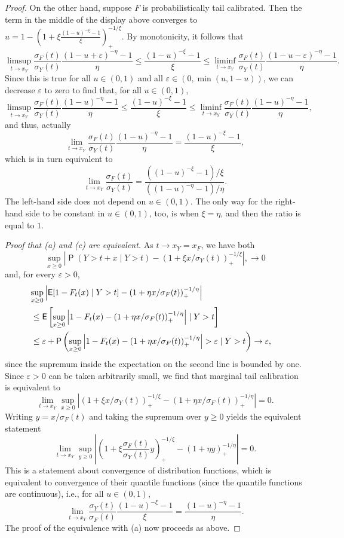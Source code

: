 \documentclass[12pt]{article}
\newcommand{\E}{\operatorname{\mathsf{E}}}
\newcommand{\Q}{\operatorname{\mathsf{P}}}
\newcommand{\1}{\mathbf{1}} %
\newcommand{\eps}{\varepsilon}
\theoremstyle{definition}
\begin{document}
\begin{proof}
On the other hand, suppose $F$ is probabilistically tail calibrated. Then the term in the middle of the display above converges to $u = 1 - (1+\xi \frac{(1-u)^{-\xi}-1}{\xi})_+^{-1/\xi}$. By monotonicity, it follows that
\[
	\limsup_{t \to x_Y}
	\frac{\sigma_F(t)}{\sigma_Y(t)} \frac{(1-u+\eps)^{-\eta}-1}{\eta}
	\le 
	\frac{(1-u)^{-\xi}-1}{\xi}
	\le
	\liminf_{t \to x_Y}
	\frac{\sigma_F(t)}{\sigma_Y(t)} \frac{(1-u-\eps)^{-\eta}-1}{\eta}.
\]
Since this is true for all $u \in (0, 1)$ and all $\eps \in (0, \min(u,1-u))$, we can decrease $\eps$ to zero to find that, for all $u \in (0,1)$,
\[
	\limsup_{t \to x_Y}
	\frac{\sigma_F(t)}{\sigma_Y(t)} \frac{(1-u)^{-\eta}-1}{\eta}
	\le 
	\frac{(1-u)^{-\xi}-1}{\xi}
	\le
	\liminf_{t \to x_Y}
	\frac{\sigma_F(t)}{\sigma_Y(t)} \frac{(1-u)^{-\eta}-1}{\eta},
\]
and thus, actually
\[
	\lim_{t \to x_Y}
	\frac{\sigma_F(t)}{\sigma_Y(t)} \frac{(1-u)^{-\eta}-1}{\eta}
	=
	\frac{(1-u)^{-\xi}-1}{\xi},
\]
which is in turn equivalent to
\[
	\lim_{t \to x_Y}
	\frac{\sigma_F(t)}{\sigma_Y(t)} 
	=
	\frac{\left((1-u)^{-\xi}-1\right)/\xi}{\left((1-u)^{-\eta}-1\right)/\eta}.
\]
The left-hand side does not depend on $u \in (0, 1)$.
The only way for the right-hand side to be constant in $u \in (0, 1)$, too, is when $\xi = \eta$, and then the ratio is equal to $1$.

\noindent\emph{Proof that (a) and (c) are equivalent.}
As $t \to x_Y = x_F$, we have both
\[
	\sup_{x \ge 0} \left| \Q(Y > t + x \mid Y > t) - \left(1+\xi x/\sigma_Y(t)\right)_+^{-1/\xi} \right|,
	\to 0
\]
and, for every $\eps > 0$,
\begin{align*}
	\lefteqn{
		\sup_{x \ge 0} \left| \E[1-F_t(x) \mid Y>t] - \left(1+\eta x/\sigma_F(t)\right)_+^{-1/\eta} \right| 
	} \\
	&\le
	\E\left[ \sup_{x \ge 0} \left| 1-F_t(x) - \left(1+\eta x/\sigma_F(t)\right)_+^{-1/\eta} \right| \mid Y>t \right] \\
	&\le \eps + \Q \left( \sup_{x \ge 0} \left| 1-F_t(x) - \left(1+\eta x/\sigma_F(t)\right)_+^{-1/\eta} \right| > \eps \mid Y>t \right) 
	\to \eps,
\end{align*}
since the supremum inside the expectation on the second line is bounded by one. Since $\eps > 0$ can be taken arbitrarily small, we find that marginal tail calibration is equivalent to
\[
	\lim_{t \to x_Y} \sup_{x \ge 0}
	\left|
		\left(1+\xi x/\sigma_Y(t)\right)_+^{-1/\xi}
		-
		\left(1+\eta x/\sigma_F(t)\right)_+^{-1/\eta}
	\right|
	= 0.
\]
Writing $y = x/\sigma_F(t)$ and taking the supremum over $y \ge 0$ yields the equivalent statement
\[
	\lim_{t \to x_Y} \sup_{y \ge 0}
	\left|
	\left(1+\xi \frac{\sigma_F(t)}{\sigma_Y(t)} y\right)_+^{-1/\xi}
	-
	\left(1+\eta y\right)_+^{-1/\eta}
	\right|
	= 0.
\]
This is a statement about convergence of distribution functions, which is equivalent to convergence of their quantile functions (since the quantile functions are continuous), i.e., for all $u \in (0,1)$, 
\[
	\lim_{t \to x_Y} \frac{\sigma_Y(t)}{\sigma_F(t)}
	\frac{(1-u)^{-\xi}-1}{\xi} = \frac{(1-u)^{-\eta}-1}{\eta}.
\]
The proof of the equivalence with (a) now proceeds as above.
\end{proof}
\end{document}
